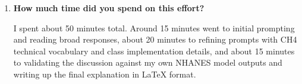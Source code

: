 \documentclass[10pt]{extarticle}
\begin{document}
\begin{enumerate}[label=\arabic*., leftmargin=2em]
\item \textbf{How much time did you spend on this effort?}

I spent about 50 minutes total. Around 15 minutes went to initial prompting and reading broad responses, about 20 minutes to refining prompts with CH4 technical vocabulary and class implementation details, and about 15 minutes to validating the discussion against my own NHANES model outputs and writing up the final explanation in LaTeX format.

\end{enumerate}
\end{document}
